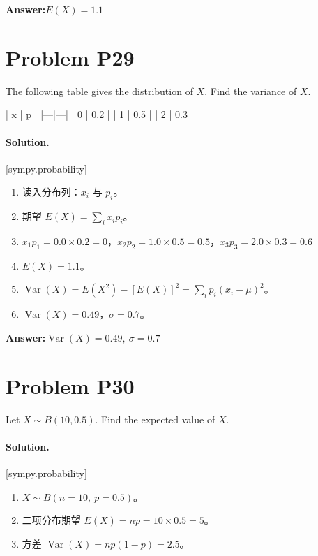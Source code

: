 \documentclass[11pt,a4paper]{ctexart}
\newcommand{\solvertag}[1]{{\footnotesize\color{gray}\textsf{[#1]}}}
\begin{document}
\noindent\textbf{Answer:}\quad $E(X) = 1.1$

\medskip

\section*{Problem P29}
The following table gives the distribution of $X$. Find the variance of $X$.

| x | p |
|---|---|
| 0 | 0.2 |
| 1 | 0.5 |
| 2 | 0.3 |

\paragraph{Solution.} \solvertag{sympy.probability} 

\begin{enumerate}[leftmargin=*]
  \item 读入分布列：$x_i$ 与 $p_i$。
  \item 期望 $E(X) = \sum_i x_i p_i$。
  \item $x_{1}p_{1} = 0.0 \times 0.2 = 0$，$x_{2}p_{2} = 1.0 \times 0.5 = 0.5$，$x_{3}p_{3} = 2.0 \times 0.3 = 0.6$
  \item $E(X) = 1.1$。
  \item $\operatorname{Var}(X) = E(X^2) - [E(X)]^2 = \sum_i p_i(x_i - \mu)^2$。
  \item $\operatorname{Var}(X) = 0.49$，$\sigma = 0.7$。
\end{enumerate}

\noindent\textbf{Answer:}\quad $\operatorname{Var}(X) = 0.49,\ \sigma = 0.7$

\medskip

\section*{Problem P30}
Let $X \sim B(10, 0.5)$. Find the expected value of $X$.

\paragraph{Solution.} \solvertag{sympy.probability} 

\begin{enumerate}[leftmargin=*]
  \item $X \sim B(n=10,\ p=0.5)$。
  \item 二项分布期望 $E(X) = np = 10\times0.5 = 5$。
  \item 方差 $\operatorname{Var}(X) = np(1-p) = 2.5$。
\end{enumerate}
\end{document}

